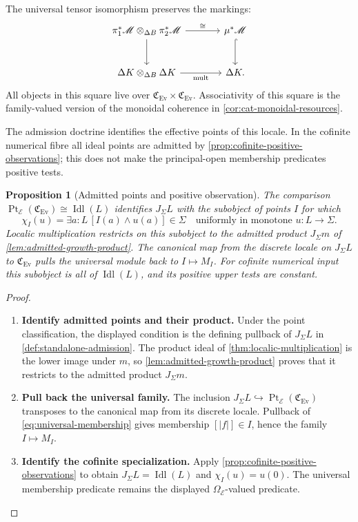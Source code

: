 \documentclass[11pt,a4paper]{article}
\numberwithin{algorithm}{section}
\numberwithin{equation}{section}
\newtheorem{proposition}[proposition]{Proposition}
\theoremstyle{definition}
\theoremstyle{remark}
\theoremstyle{plain}
\newcommand{\E}{\mathcal E}
\newcommand{\Truth}{\Omega_{\E}}
\newcommand{\Idl}{\operatorname{Idl}}
\newcommand{\J}{J_{\Sigma}}
\newcommand{\incl}{\hookrightarrow}
\newcommand{\Ev}{{\operatorname{Ev}}}
\newcommand{\abs}[1]{\lvert #1\rvert}
\newcommand{\Cplx}{\mathfrak C_{\Ev}}
\theoremstyle{definition}
\theoremstyle{plain}
\begin{document}
The universal tensor isomorphism preserves the markings:
\[
\begin{tikzcd}[column sep=large,row sep=large]
 \pi_1^*\mathscr M\otimes_{\Delta B}\pi_2^*\mathscr M
   \arrow[r,"{\cong}"] \arrow[d]
   & \mu^*\mathscr M \arrow[d,hook]\\
 \Delta K\otimes_{\Delta B}\Delta K
   \arrow[r,"{\mathrm{mult}}"'] & \Delta K .
\end{tikzcd}
\]
All objects in this square live over $\Cplx\times\Cplx$.
Associativity of this square is the family-valued version of the
monoidal coherence in \cref{cor:cat-monoidal-resources}.


The admission doctrine identifies the effective points of this
locale. In the cofinite numerical fibre all ideal points are
admitted by \cref{prop:cofinite-positive-observations}; this does
not make the principal-open membership predicates positive tests.
\begin{proposition}[Admitted points and positive observation]
\label{prop:localic-admission}
The comparison $\operatorname{Pt}_{\E}(\Cplx)\cong\Idl(L)$ identifies
$\J L$ with the subobject of points $I$ for which
\[
 \chi_I(u)=\exists a:L\,[I(a)\wedge u(a)]\in\Sigma
 \quad\text{uniformly in monotone }u:L\to\Sigma.
\]
Localic multiplication restricts on this subobject to the
admitted product $\J m$ of \cref{lem:admitted-growth-product}.
The canonical map from the discrete locale on $\J L$ to
$\Cplx$ pulls the universal module back to $I\mapsto M_I$.
For cofinite numerical input this subobject is all of $\Idl(L)$,
and its positive upper tests are constant.
\end{proposition}
\begin{proof}\leavevmode
\begin{enumerate}[leftmargin=*,align=left]
\item \textbf{Identify admitted points and their product.}
Under the point classification, the displayed condition is the
defining pullback of $\J L$ in \cref{def:standalone-admission}.
The product ideal of \cref{thm:localic-multiplication} is the lower
image under $m$, so \cref{lem:admitted-growth-product} proves that
it restricts to the admitted product $\J m$.

\item \textbf{Pull back the universal family.}
The inclusion $\J L\incl\operatorname{Pt}_{\E}(\Cplx)$
transposes to the canonical map from its discrete locale.
Pullback of \eqref{eq:universal-membership} gives membership
$[\abs f]\in I$, hence the family $I\mapsto M_I$.

\item \textbf{Identify the cofinite specialization.}
Apply \cref{prop:cofinite-positive-observations} to obtain
$\J L=\Idl(L)$ and $\chi_I(u)=u(0)$. The universal membership
predicate remains the displayed $\Truth$-valued predicate.
\end{enumerate}
\end{proof}
\end{document}
